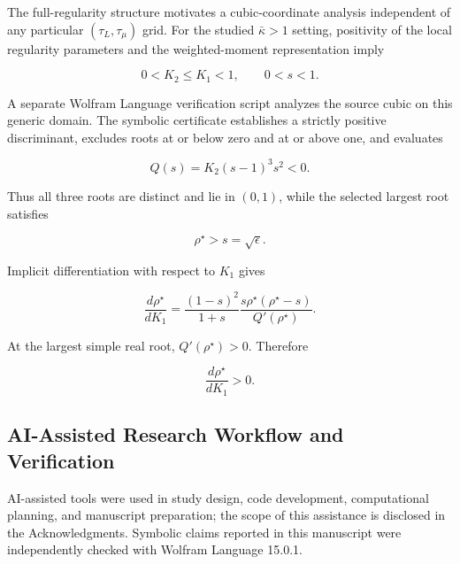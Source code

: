 The full-regularity structure motivates a cubic-coordinate analysis independent of any particular $(\tau_L,\tau_\mu)$ grid. For the studied $\bar{\kappa}>1$ setting, positivity of the local regularity parameters and the weighted-moment representation imply

\[
0<K_2\le K_1<1,
\qquad
0<s<1.
\]

A separate Wolfram Language verification script analyzes the source cubic on this generic domain. The symbolic certificate establishes a strictly positive discriminant, excludes roots at or below zero and at or above one, and evaluates

\[
Q(s)=K_2(s-1)^3s^2<0.
\]

Thus all three roots are distinct and lie in $(0,1)$, while the selected largest root satisfies

\[
\rho^\star>s=\sqrt\epsilon.
\]

Implicit differentiation with respect to $K_1$ gives

\[
\frac{d\rho^\star}{dK_1}
=
\frac{(1-s)^2}{1+s}
\frac{s\rho^\star(\rho^\star-s)}{Q'(\rho^\star)}.
\]

At the largest simple real root, $Q'(\rho^\star)>0$. Therefore

\[
\frac{d\rho^\star}{dK_1}>0.
\]

\subsection{AI-Assisted Research Workflow and Verification}
AI-assisted tools were used in study design, code development, computational planning, and manuscript preparation; the scope of this assistance is disclosed in the Acknowledgments. Symbolic claims reported in this manuscript were independently checked with Wolfram Language 15.0.1.
